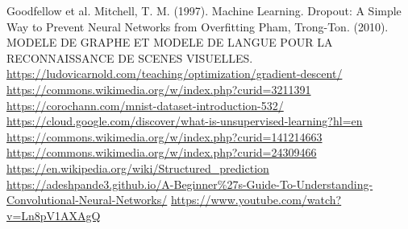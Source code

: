 \documentclass{beamer}
\begin{document}
\begin{thebibliography}{99}
    Goodfellow et al.
    Mitchell, T. M. (1997). Machine Learning.
    Dropout: A Simple Way to Prevent Neural Networks from Overfitting
    Pham, Trong-Ton. (2010). MODELE DE GRAPHE ET MODELE DE LANGUE POUR LA RECONNAISSANCE DE SCENES VISUELLES.
    \url{https://ludovicarnold.com/teaching/optimization/gradient-descent/}
    \url{https://commons.wikimedia.org/w/index.php?curid=3211391}
    \url{https://corochann.com/mnist-dataset-introduction-532/}
    \url{https://cloud.google.com/discover/what-is-unsupervised-learning?hl=en}
    \url{https://commons.wikimedia.org/w/index.php?curid=141214663}
    \url{https://commons.wikimedia.org/w/index.php?curid=24309466}
    \url{https://en.wikipedia.org/wiki/Structured_prediction}
    \url{https://adeshpande3.github.io/A-Beginner%27s-Guide-To-Understanding-Convolutional-Neural-Networks/}
    \url{https://www.youtube.com/watch?v=Ln8pV1AXAgQ}
\end{thebibliography}
\end{document}
